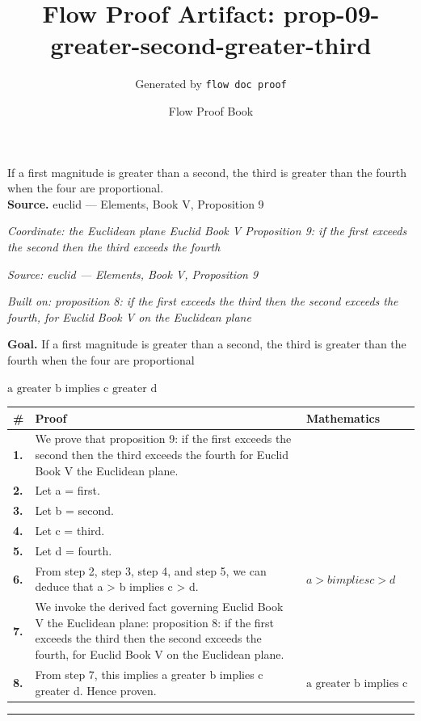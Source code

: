\documentclass[11pt]{article}
\title{Flow Proof Artifact: prop-09-greater-second-greater-third}
\author{Generated by \texttt{flow doc proof}}
\date{Flow Proof Book}
\theoremstyle{definition}
\begin{document}
\maketitle
If a first magnitude is greater than a second, the third is greater than the fourth when the four are proportional.\\[0.5em]
\textbf{Source.} euclid — Elements, Book V, Proposition 9\\[0.5em]
\bigskip
{}\par
\smallskip\noindent\textit{Coordinate: the Euclidean plane \cdot Euclid Book V \cdot Proposition 9: if the first exceeds the second then the third exceeds the fourth}\par
\smallskip\noindent\textit{Source: euclid — Elements, Book V, Proposition 9}\par
\smallskip\noindent\textit{Built on: proposition 8: if the first exceeds the third then the second exceeds the fourth, for Euclid Book V on the Euclidean plane}\par
\medskip
\noindent\textbf{Goal.} If a first magnitude is greater than a second, the third is greater than the fourth when the four are proportional\par
\noindent$\displaystyle \text{a greater b implies c greater d}$\par
\medskip
\noindent
\begin{tabular}{@{} >{\raggedright\arraybackslash}p{} >{\raggedright\arraybackslash}p{} >{\raggedleft\arraybackslash}p{} @{}}
\textbf{\#} & \textbf{Proof} & \textbf{Mathematics} \\
\midrule
\textbf{1.} & We prove that proposition 9: if the first exceeds the second then the third exceeds the fourth for Euclid Book V the Euclidean plane. & \\[0.45em]
\textbf{2.} & Let a = first. & \\[0.45em]
\textbf{3.} & Let b = second. & \\[0.45em]
\textbf{4.} & Let c = third. & \\[0.45em]
\textbf{5.} & Let d = fourth. & \\[0.45em]
\textbf{6.} & From step 2, step 3, step 4, and step 5, we can deduce that a > b implies c > d. & $\displaystyle a > b implies c > d$ \\[0.45em]
\textbf{7.} & We invoke the derived fact governing Euclid Book V the Euclidean plane: proposition 8: if the first exceeds the third then the second exceeds the fourth, for Euclid Book V on the Euclidean plane. & \\[0.45em]
\textbf{8.} & From step 7, this implies a greater b implies c greater d. Hence proven. & $\displaystyle \text{a greater b implies c greater d}$ \\[0.45em]
\bottomrule
\end{tabular}
\label{thm:Geometry-Euclid Book V-proposition_9_if_the_first_exceeds_the_second_then_the_third_exceeds_the_fourth}
\par\medskip\hrule
\end{document}
